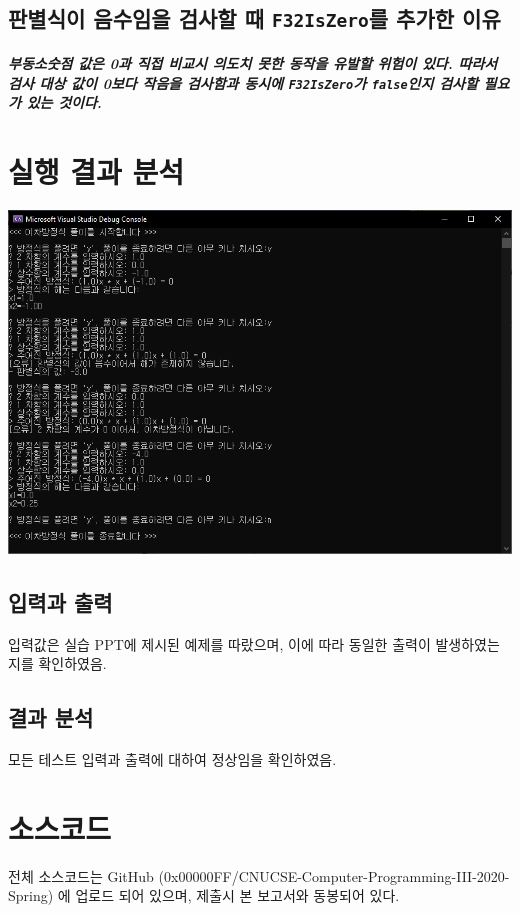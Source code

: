 \documentclass{article}
\begin{document}
    \subsection{판별식이 음수임을 검사할 때 \texttt{F32IsZero}를 추가한 이유}

    \subparagraph{\normalfont 부동소숫점 값은 0과 직접 비교시 의도치 못한 동작을 유발할 위험이 있다. 따라서 검사 대상 값이 0보다 작음을 검사함과 동시에 \texttt{F32IsZero}가 \texttt{false}인지 검사할 필요가 있는 것이다.}

    \section{실행 결과 분석}

    \includegraphics[width=\textwidth]{test_result.png}

    \subsection{입력과 출력}

    입력값은 실습 PPT에 제시된 예제를 따랐으며, 이에 따라 동일한 출력이 발생하였는 지를 확인하였음.

    \subsection{결과 분석}

    모든 테스트 입력과 출력에 대하여 정상임을 확인하였음. 
    
    \section{소스코드}
    전체 소스코드는 GitHub (0x00000FF/CNUCSE-Computer-Programming-III-2020-Spring) 에 업로드 되어 있으며, 제출시 본 보고서와 동봉되어 있다.
\end{document}
